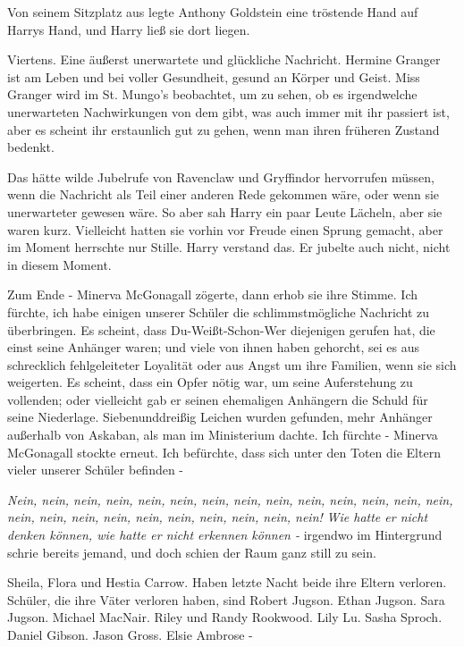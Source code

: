 Von seinem Sitzplatz aus legte Anthony Goldstein eine tröstende Hand auf Harrys
Hand, und Harry ließ sie dort liegen.

\glqq{}Viertens. Eine äußerst unerwartete und glückliche Nachricht. Hermine
Granger ist am Leben und bei voller Gesundheit, gesund an Körper und Geist. Miss
Granger wird im St. Mungo's beobachtet, um zu sehen, ob es irgendwelche
unerwarteten Nachwirkungen von dem gibt, was auch immer mit ihr passiert ist,
aber es scheint ihr erstaunlich gut zu gehen, wenn man ihren früheren Zustand
bedenkt.\grqq{}

Das hätte wilde Jubelrufe von Ravenclaw und Gryffindor hervorrufen müssen, wenn
die Nachricht als Teil einer anderen Rede gekommen wäre, oder wenn sie
unerwarteter gewesen wäre. So aber sah Harry ein paar Leute Lächeln, aber sie
waren kurz. Vielleicht hatten sie vorhin vor Freude einen Sprung gemacht, aber
im Moment herrschte nur Stille. Harry verstand das. Er jubelte auch nicht, nicht
in diesem Moment.

\glqq{}Zum Ende -\grqq{} Minerva McGonagall zögerte, dann erhob sie ihre Stimme.
\glqq{}Ich fürchte, ich habe einigen unserer Schüler die schlimmstmögliche
Nachricht zu überbringen. Es scheint, dass Du-Weißt-Schon-Wer diejenigen gerufen
hat, die einst seine Anhänger waren; und viele von ihnen haben gehorcht, sei es
aus schrecklich fehlgeleiteter Loyalität oder aus Angst um ihre Familien, wenn
sie sich weigerten. Es scheint, dass ein Opfer nötig war, um seine Auferstehung
zu vollenden; oder vielleicht gab er seinen ehemaligen Anhängern die Schuld für
seine Niederlage. Siebenunddreißig Leichen wurden gefunden, mehr Anhänger
außerhalb von Askaban, als man im Ministerium dachte. Ich fürchte -\grqq{}
Minerva McGonagall stockte erneut. \glqq{}Ich befürchte, dass sich unter den
Toten die Eltern vieler unserer Schüler befinden -\grqq{}

\emph{Nein, nein, nein, nein, nein, nein, nein, nein, nein, nein, nein, nein,
nein, nein, nein, nein, nein, nein, nein, nein, nein, nein, nein, nein!}
\emph{Wie hatte er nicht denken können, wie hatte er nicht erkennen können -}
irgendwo im Hintergrund schrie bereits jemand, und doch schien der Raum ganz
still zu sein.

\glqq{}Sheila, Flora und Hestia Carrow. Haben letzte Nacht beide ihre Eltern
verloren. Schüler, die ihre Väter verloren haben, sind Robert Jugson. Ethan
Jugson. Sara Jugson. Michael MacNair. Riley und Randy Rookwood. Lily Lu. Sasha
Sproch. Daniel Gibson. Jason Gross. Elsie Ambrose -\grqq{}

